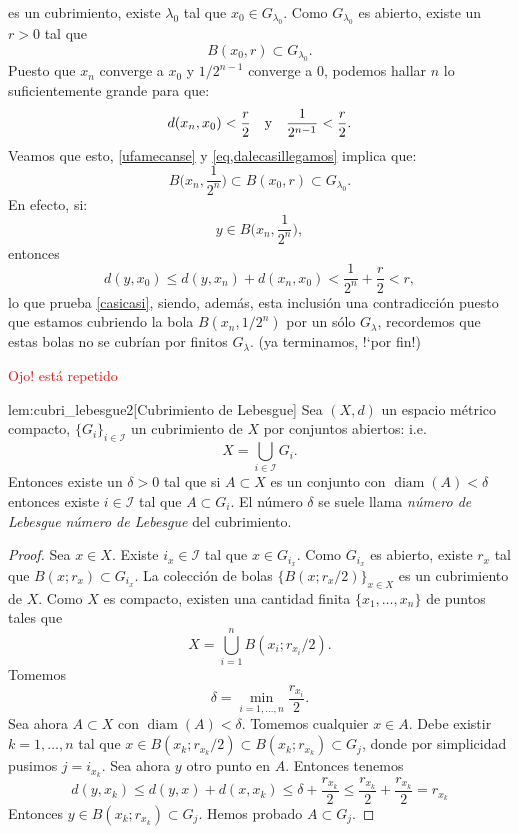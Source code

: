 \begin{demo}
es un cubrimiento, existe $\lambda_0$ tal que $x_0\in G_{\lambda_0}$. Como
$G_{\lambda_0}$ es abierto, existe un $r>0$ tal que
\begin{equation}\label{eq,dalecasillegamos}
	B(x_0,r)\subset G_{\lambda_0}.
\end{equation}
Puesto que $x_n$ converge a $x_0$ y $1/2^{n-1}$ converge a 0,
podemos hallar $n$ lo suficientemente grande para que:
\begin{equation}\label{ufamecanse}
	d(x_n,x_0)<\frac{r}{2}\quad\hbox{y}\quad
	\frac{1}{2^{n-1}}<\frac{r}{2}.
\end{equation}
Veamos que esto, \eqref{ufamecanse} y \eqref{eq,dalecasillegamos}
implica que:
\begin{equation}\label{casicasi}
	B\Big(x_n,\frac{1}{2^n}\Big)\subset B(x_0,r)\subset G_{\lambda_0}.
\end{equation}
En efecto, si:
\[
	 y\in B\Big(x_n,\frac{1}{2^n}\Big),
\]
entonces
\[
	d(y,x_0)\leq d(y,x_n)+d(x_n,x_0)<\frac{1}{2^n}+\frac{r}{2}<r,
\]
lo que prueba \eqref{casicasi}, siendo, además, esta inclusión
una contradicción puesto que estamos cubriendo la bola
$B(x_n,1/2^n)$ por un sólo $G_{\lambda}$, recordemos que estas
bolas no se cubrían por finitos $G_{\lambda}$. (ya terminamos,
!`por fin!)
 \end{demo}

 
 \textcolor{red}{Ojo! está repetido}
\begin{lema}{lem:cubri_lebesgue2}[Cubrimiento de Lebesgue] Sea $(X,d)$ un espacio métrico compacto, $\{G_i\}_{i\in\mathscr{I}}$ un cubrimiento de $X$ por conjuntos abiertos: i.e.
\[
 X=\bigcup_{i\in\mathscr{I}}G_i.
\]
Entonces existe un $\delta>0$ tal que si $A\subset X$ es un conjunto con $\operatorname{diam}(A)<\delta$ entonces existe $i\in\mathscr{I}$ tal que $A\subset G_i$. El número $\delta$ se suele llama  \emph{número de Lebesgue} \emph{número de Lebesgue} del cubrimiento.
 
\end{lema}
\begin{proof} Sea $x\in X$. Existe $i_x\in\mathscr{I}$ tal que $x\in G_{i_x}$. Como $G_{i_x}$ es abierto, existe $r_x$ tal que $B(x;r_x)\subset G_{i_x}$. La colección de bolas $\{B(x;r_x/2)\}_{x\in X}$ es un cubrimiento de $X$. Como $X$ es compacto, existen una cantidad finita $\{x_1,\ldots,x_n\}$ de puntos tales que
\[
 X=\bigcup_{i=1}^n B(x_i;r_{x_i}/2).
\]
Tomemos 
\[
 \delta=\min_{i=1,\ldots,n}\frac{r_{x_i}}{2}.
\]
Sea ahora $A\subset X$ con $\operatorname{diam}(A)<\delta$. Tomemos cualquier $x\in A$. Debe existir $k=1,\ldots,n$ tal que $x\in B(x_k;r_{x_k}/2)\subset B(x_k;r_{x_k})\subset G_j$, donde por simplicidad pusimos $j=i_{x_k}$. Sea ahora $y$ otro punto en $A$. Entonces tenemos
\[
 d(y,x_k)\leq d(y,x)+d(x,x_k)\leq\delta + \frac{r_{x_k}}{2}\leq\frac{r_{x_k}}{2}+ \frac{r_{x_k}}{2}=r_{x_k}
\]
Entonces $y\in B(x_k;r_{x_k})\subset  G_j$. Hemos probado $A\subset G_j$. 
\end{proof}
 

